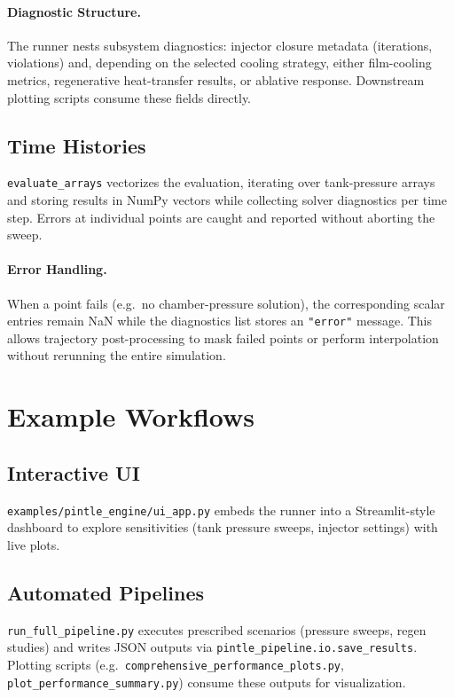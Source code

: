 \documentclass[12pt]{article}
\begin{document}
\paragraph{Diagnostic Structure.}  The runner nests subsystem diagnostics: injector closure metadata (iterations, violations) and, depending on the selected cooling strategy, either film-cooling metrics, regenerative heat-transfer results, or ablative response.  Downstream plotting scripts consume these fields directly.

\subsection{Time Histories}
\verb|evaluate_arrays| vectorizes the evaluation, iterating over tank-pressure arrays and storing results in NumPy vectors while collecting solver diagnostics per time step.  Errors at individual points are caught and reported without aborting the sweep.

\paragraph{Error Handling.}  When a point fails (e.g.\ no chamber-pressure solution), the corresponding scalar entries remain NaN while the diagnostics list stores an \verb|"error"| message.  This allows trajectory post-processing to mask failed points or perform interpolation without rerunning the entire simulation.

\section{Example Workflows}

\subsection{Interactive UI}
\verb|examples/pintle_engine/ui_app.py| embeds the runner into a Streamlit-style dashboard to explore sensitivities (tank pressure sweeps, injector settings) with live plots.

\subsection{Automated Pipelines}
\verb|run_full_pipeline.py| executes prescribed scenarios (pressure sweeps, regen studies) and writes JSON outputs via \verb|pintle_pipeline.io.save_results|.  Plotting scripts (e.g.\ \verb|comprehensive_performance_plots.py|, \verb|plot_performance_summary.py|) consume these outputs for visualization.
\end{document}
